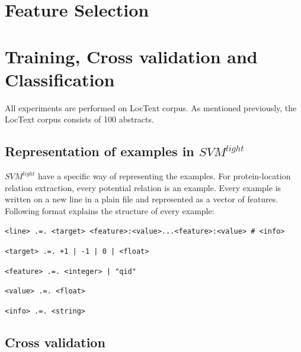 \section{Feature Selection}\label{sec:featSel}

%
%
%

\section{Training, Cross validation and Classification}\label{sec:training}

All experiments are performed on LocText \cite{loctext} corpus. As mentioned previously, the LocText corpus consists of 100 abstracts.

\subsection{Representation of examples in $SVM^{light}$ }

$SVM^{light}$ \cite{joachims1999making} have a specific way of representing the examples. For protein-location relation extraction, every potential relation is an example. Every example is written on a new line in a plain file and represented as a vector of features. Following format explains the structure of every example:

\bigskip

\texttt{<line> .=. <target> <feature>:<value>...<feature>:<value> \# <info>}

\texttt{<target> .=. +1 | -1 | 0 | <float>}

\texttt{<feature> .=. <integer> | "qid"}

\texttt{<value> .=. <float>}

\texttt{<info> .=. <string>}

\subsection{Cross validation}

